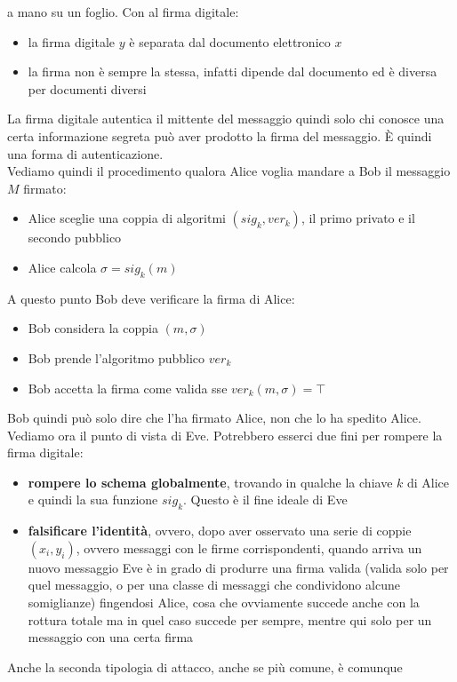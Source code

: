 \documentclass[a4paper,12pt, oneside]{book}
\begin{document}
a mano su un foglio. Con al firma digitale:
\begin{itemize}
  \item la firma digitale $y$ è separata dal documento elettronico $x$
  \item la firma non è sempre la stessa, infatti dipende dal documento ed è
  diversa per documenti diversi  
\end{itemize}
La firma digitale autentica il mittente del messaggio quindi solo chi conosce
una certa informazione segreta può aver prodotto la firma del messaggio. È
quindi una forma di autenticazione.\\
Vediamo quindi il procedimento qualora Alice voglia mandare a Bob il messaggio
$M$ firmato:
\begin{itemize}
  \item Alice sceglie una coppia di algoritmi $(sig_k,ver_k)$, il primo privato
  e il secondo pubblico
  \item Alice calcola $\sigma=sig_k(m)$
\end{itemize}
A questo punto Bob deve verificare la firma di Alice:
\begin{itemize}
  \item Bob considera la coppia $(m,\sigma)$
  \item Bob prende l'algoritmo pubblico $ver_k$
  \item Bob accetta la firma come valida sse $ver_k(m,\sigma)=\top$
\end{itemize}
Bob quindi può solo dire che l'ha firmato Alice, non che lo ha spedito Alice.\\
Vediamo ora il punto di vista di Eve. Potrebbero esserci due fini per rompere la
firma digitale:
\begin{itemize}
  \item \textbf{rompere lo schema globalmente}, trovando in qualche la chiave
  $k$ di Alice e quindi la sua funzione $sig_k$. Questo è il fine ideale di Eve
  \item \textbf{falsificare l'identità}, ovvero, dopo aver osservato una serie
  di coppie $(x_i,y_i)$, ovvero messaggi con le firme corrispondenti, quando
  arriva un nuovo messaggio Eve è in grado di produrre una firma valida (valida
  solo per quel messaggio, o per una classe di messaggi che condividono alcune
  somiglianze) fingendosi Alice, cosa che ovviamente succede anche con la
  rottura totale ma in quel caso succede per sempre, mentre qui solo per un
  messaggio con una certa firma
\end{itemize}
Anche la seconda tipologia di attacco, anche se più comune, è comunque
\end{document}
